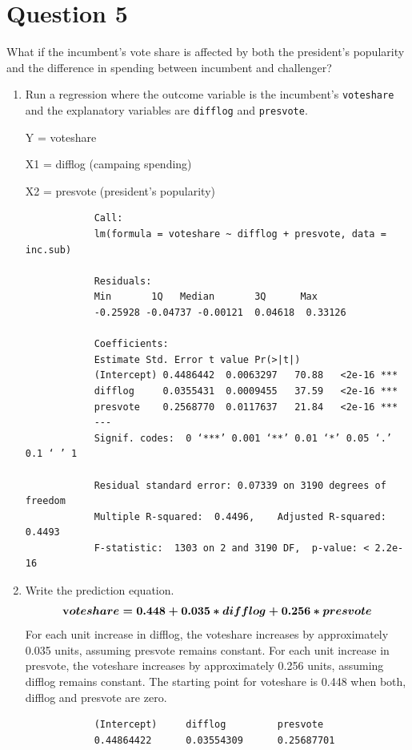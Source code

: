 \documentclass[12pt,letterpaper]{article}
\begin{document}
\section*{Question 5}
\noindent What if the incumbent's vote share is affected by both the president's popularity and the difference in spending between incumbent and challenger? 
	\begin{enumerate}
	
	
		\item Run a regression where the outcome variable is the incumbent's \texttt{voteshare} and the explanatory variables are \texttt{difflog} and \texttt{presvote}.	
			\vspace{.5cm}
		
			Y = voteshare
		
			X1 = difflog (campaing spending)
			
			X2 = presvote (president’s popularity)
			\vspace{.5cm}
		
			  
			\begin{verbatim}
			Call:
			lm(formula = voteshare ~ difflog + presvote, data = inc.sub)
		
			Residuals:
			Min       1Q   Median       3Q      Max 
			-0.25928 -0.04737 -0.00121  0.04618  0.33126 
		
			Coefficients:
			Estimate Std. Error t value Pr(>|t|)    
			(Intercept) 0.4486442  0.0063297   70.88   <2e-16 ***
			difflog     0.0355431  0.0009455   37.59   <2e-16 ***
			presvote    0.2568770  0.0117637   21.84   <2e-16 ***
			---
			Signif. codes:  0 ‘***’ 0.001 ‘**’ 0.01 ‘*’ 0.05 ‘.’ 0.1 ‘ ’ 1
		
			Residual standard error: 0.07339 on 3190 degrees of freedom
			Multiple R-squared:  0.4496,	Adjusted R-squared:  0.4493 
			F-statistic:  1303 on 2 and 3190 DF,  p-value: < 2.2e-16
			\end{verbatim}



	\newpage	
		
		
		
		
		\item Write the prediction equation.
			\vspace{.25cm}
			\[
			\boldmath
			\textbf
			voteshare = 0.448 + 0.035 * difflog + 0.256 * presvote
			\]
			For each unit increase in difflog, the voteshare increases by approximately 0.035 units, assuming presvote remains constant. 
			For each unit increase in presvote, the voteshare increases by approximately 0.256 units, assuming difflog remains constant. 
			The starting point for voteshare is 0.448 when both, difflog and presvote are zero.
			\vspace{.25cm}
			 
			\begin{verbatim}
			(Intercept)     difflog         presvote 
			0.44864422      0.03554309      0.25687701 
			\end{verbatim}			
		

\end{enumerate}
\end{document}

